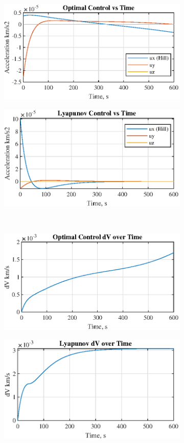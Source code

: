 \documentclass[conf]{new-aiaa}
\begin{document}
\begin{singlespace}
\begin{figure}[htpb!]
\begin{subfigure}{.5\textwidth}
  \centering
  \includegraphics[width=.8\linewidth]{figures/controlsH.eps}
\end{subfigure}%
\begin{subfigure}{.5\textwidth}
  \centering
  \includegraphics[width=.8\linewidth]{figures/controlsCart.eps}
\end{subfigure}
\\
\begin{subfigure}{.5\textwidth}
  \centering
  \includegraphics[width=.8\linewidth]{figures/dVOptimal.eps}
\end{subfigure}%
\begin{subfigure}{.5\textwidth}
  \centering
  \includegraphics[width=.8\linewidth]{figures/dVCart.eps}

\end{subfigure}
\end{figure}
\end{singlespace}
\end{document}
